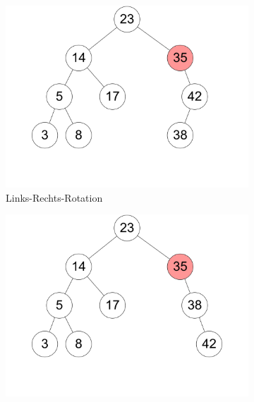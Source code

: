 \documentclass[11pt,a4paper]{article}
\begin{document}
\begin{loesung}
\begin{enumerate}
\begin{figure}[h!]
\begin{subfigure}[b]{0.23\textwidth}
                \includegraphics[width=\textwidth]{img/3a_7}
                \caption*{Links-Rechts-Rotation}
            \end{subfigure}
            \begin{subfigure}[b]{0.23\textwidth}
                \centering
                \includegraphics[width=\textwidth]{img/3a_8}
                \caption*{}
            \end{subfigure}
            \begin{subfigure}[b]{0.23\textwidth}
                \centering

\end{subfigure}
\end{figure}
\end{enumerate}
\end{loesung}
\end{document}
